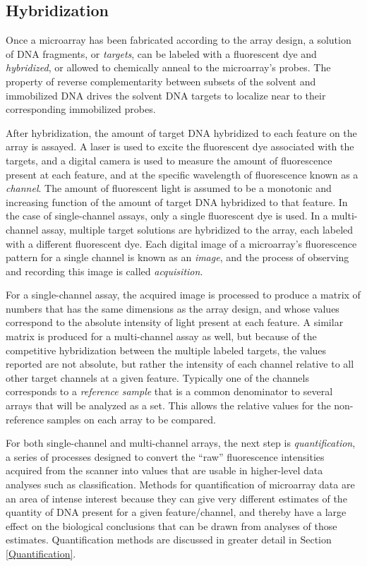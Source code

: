 \subsection{Hybridization}\label{Hybridization}

Once a microarray has been fabricated according to the array design, a solution
of DNA fragments, or \emph{targets}, can be labeled with a fluorescent dye and
\emph{hybridized}, or allowed to chemically anneal to the microarray's probes.
The property of reverse complementarity between subsets of the solvent and
immobilized DNA drives the solvent DNA targets to localize near to their
corresponding immobilized probes.

After hybridization, the amount of target DNA hybridized to each feature on the
array is assayed.  A laser is used to excite the fluorescent dye associated
with the targets, and a digital camera is used to measure the amount of
fluorescence present at each feature, and at the specific wavelength of
fluorescence known as a \emph{channel}.  The amount of fluorescent light is
assumed to be a monotonic and increasing function of the amount of target DNA
hybridized to that feature.  In the case of single-channel assays, only a
single fluorescent dye is used.  In a multi-channel assay, multiple target
solutions are hybridized to the array, each labeled with a different
fluorescent dye.  Each digital image of a microarray's fluorescence pattern for
a single channel is known as an \emph{image}, and the process of observing and
recording this image is called \emph{acquisition}.

For a single-channel assay, the acquired image is processed to produce a matrix
of numbers that has the same dimensions as the array design, and whose values
correspond to the absolute intensity of light present at each feature.  A
similar matrix is produced for a multi-channel assay as well, but because of
the competitive hybridization between the multiple labeled targets, the values
reported are not absolute, but rather the intensity of each channel relative to
all other target channels at a given feature.  Typically one of the channels
corresponds to a \emph{reference sample} that is a common denominator to
several arrays that will be analyzed as a set.  This allows the relative values
for the non-reference samples on each array to be compared.

For both single-channel and multi-channel arrays, the next step is
\emph{quantification}, a series of processes designed to convert the ``raw''
fluorescence intensities acquired from the scanner into values that are usable
in higher-level data analyses such as classification.  Methods for
quantification of microarray data are an area of intense interest
\cite{mas5,affy4,mbei,rma,vsn,gcrma,affyplm,seo,affybench} because they can
give very different estimates of the quantity of DNA present for a given
feature/channel, and thereby have a large effect on the biological conclusions
that can be drawn from analyses of those estimates.  Quantification methods are
discussed in greater detail in Section \ref{Quantification}.
